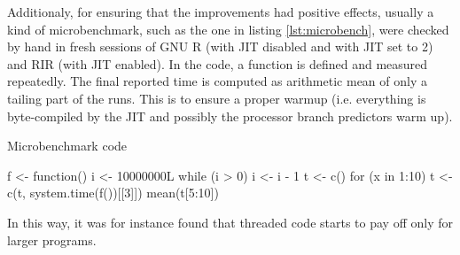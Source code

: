 Additionaly, for ensuring that the improvements had positive effects, usually a kind of microbenchmark, such as the one in listing \ref{lst:microbench}, were checked by hand in fresh sessions of GNU R (with JIT disabled and with JIT set to 2) and RIR (with JIT enabled). In the code, a function is defined and measured repeatedly. The final reported time is computed as arithmetic mean of only a tailing part of the runs. This is to ensure a proper warmup (i.e. everything is byte-compiled by the JIT and possibly the processor branch predictors warm up).

\begin{listing}[htbp]
  \caption{\label{lst:microbench}Microbenchmark code}
  \begin{rcode}
f <- function() {
    i <- 10000000L
    while (i > 0) i <- i - 1
}
t <- c()
for (x in 1:10) t <- c(t, system.time(f())[[3]])
mean(t[5:10])
  \end{rcode}
\end{listing}

In this way, it was for instance found that threaded code starts to pay off only for larger programs.

